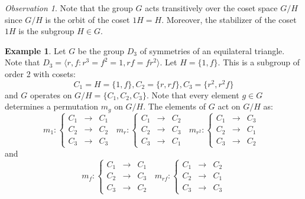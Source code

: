 \documentclass[12pt]{article}
\theoremstyle{definition}
\newtheorem{eg}[thm]{Example}
\theoremstyle{remark}
\newtheorem{obs}[thm]{Observation}
\numberwithin{equation}{section}
\begin{document}
\vspace{15pt}

\begin{obs}
        Note that the group $G$ acts transitively over the coset space $G/H$ since $G/H$ is the orbit of the coset $1H = H$. Moreover, the stabilizer of the coset $1H$ is the subgroup $H \in G$. 
\end{obs}

\vspace{15pt}

\begin{eg}
        Let $G$ be the group $D_3$ of symmetries of an equilateral triangle. Note that $D_3 = \langle r,f:r^3 = f^2 = 1, rf = fr^2\rangle$. Let $H = \{1,f\}$. This is a subgroup of order 2 with cosets:\begin{equation}
                C_1 = H = \{1,f\}, C_2 = \{r, rf\}, C_3 = \{r^2, r^2f\}
        \end{equation}
        and $G$ operates on $G/H = \{C_1,C_2,C_3\}$. Note that every element $g \in G$ determines a permutation $m_g$ on $G/H$. The elements of $G$ act on $G/H$ as:\begin{equation}
                m_1:\left\{\begin{array}{ccc} C_1 & \rightarrow & C_1 \\ C_2 & \rightarrow & C_2 \\ C_3 & \rightarrow & C_3 \end{array}\right.
                        \;\;m_r:\left\{\begin{array}{ccc} C_1 & \rightarrow & C_2 \\ C_2 & \rightarrow & C_3 \\ C_3 & \rightarrow & C_1 \end{array}\right.
                                \;\;m_{r^2}:\left\{\begin{array}{ccc} C_1 & \rightarrow & C_3 \\ C_2 & \rightarrow & C_1 \\ C_3 & \rightarrow & C_2 \end{array}\right.\;\;       
        \end{equation}
        and \begin{equation}
                m_f:\left\{\begin{array}{ccc} C_1 & \rightarrow & C_1 \\ C_2 & \rightarrow & C_3 \\ C_3 & \rightarrow & C_2 \end{array}\right.
                        \;\;m_{rf}:\left\{\begin{array}{ccc} C_1 & \rightarrow & C_2 \\ C_2 & \rightarrow & C_1 \\ C_3 & \rightarrow & C_3 \end{array}\right.

\end{equation}
\end{eg}
\end{document}
